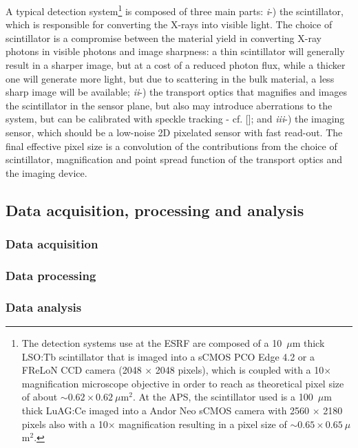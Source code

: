 \begin{refsection}
A typical detection system\footnote{The detection systems use at the ESRF are composed of a 10~$\mu$m thick LSO:Tb scintillator that is imaged into a sCMOS PCO Edge 4.2 or a FReLoN CCD camera (2048 $\times$ 2048 pixels), which is coupled with a 10$\times$ magnification microscope objective in order to reach as theoretical pixel size of about $\sim0.62\times0.62~\mu$m$^2$. At the APS, the scintillator used is a 100~$\mu$m thick LuAG:Ce imaged into a Andor Neo sCMOS camera with 2560 $\times$ 2180 pixels also with a 10$\times$ magnification resulting in a pixel size of $\sim0.65\times0.65~\mu$m$^2$.} is composed of three main parts: \textit{i}-) the scintillator, which is responsible for converting the X-rays into visible light. The choice of scintillator is a compromise between the material yield in converting X-ray photons in visible photons and image sharpness: a thin scintillator will generally result in a sharper image, but at a cost of a reduced photon flux, while a thicker one will generate more light, but due to scattering in the bulk material, a less sharp image will be available; \textit{ii}-) the transport optics that magnifies and images the scintillator in the sensor plane, but also may introduce aberrations to the system, but can be calibrated with speckle tracking - cf. [\cite[\textit{\S2.2}]{Berujon2020a}]; and \textit{iii}-) the imaging sensor, which should be a low-noise 2D pixelated sensor with fast read-out. The final effective pixel size is a convolution of the contributions from the choice of scintillator, magnification and point spread function of the transport optics and the imaging device.

\subsection{Data acquisition, processing and analysis}\label{sec:data}
\subsubsection*{Data acquisition}
\subsubsection*{Data processing}
\subsubsection*{Data analysis}


\end{refsection}
